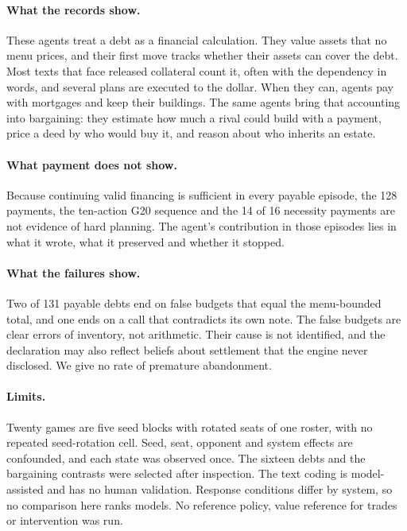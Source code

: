 \documentclass[10pt,twocolumn,letterpaper]{article}
\begin{document}
\paragraph{What the records show.} These agents treat a debt as a financial calculation. They value assets that no menu prices, and their first move tracks whether their assets can cover the debt. Most texts that face released collateral count it, often with the dependency in words, and several plans are executed to the dollar. When they can, agents pay with mortgages and keep their buildings. The same agents bring that accounting into bargaining: they estimate how much a rival could build with a payment, price a deed by who would buy it, and reason about who inherits an estate.

\paragraph{What payment does not show.} Because continuing valid financing is sufficient in every payable episode, the 128 payments, the ten-action G20 sequence and the 14 of 16 necessity payments are not evidence of hard planning. The agent's contribution in those episodes lies in what it wrote, what it preserved and whether it stopped.

\paragraph{What the failures show.} Two of 131 payable debts end on false budgets that equal the menu-bounded total, and one ends on a call that contradicts its own note. The false budgets are clear errors of inventory, not arithmetic. Their cause is not identified, and the declaration may also reflect beliefs about settlement that the engine never disclosed. We give no rate of premature abandonment.

\paragraph{Limits.} Twenty games are five seed blocks with rotated seats of one roster, with no repeated seed-rotation cell. Seed, seat, opponent and system effects are confounded, and each state was observed once. The sixteen debts and the bargaining contrasts were selected after inspection. The text coding is model-assisted and has no human validation. Response conditions differ by system, so no comparison here ranks models. No reference policy, value reference for trades or intervention was run.
\end{document}
